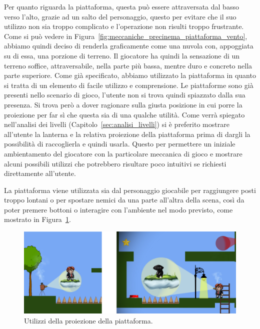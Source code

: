Per quanto riguarda la piattaforma, questa può essere attraversata dal basso verso l’alto, grazie ad un salto del personaggio, questo per evitare che il suo utilizzo non sia troppo complicato e l’operazione non risulti troppo frustrante. Come si può vedere in Figura~\ref{fig:meccaniche_precinema_piattaforma_vento}, abbiamo quindi deciso di renderla graficamente come una nuvola con, appoggiata su di essa, una porzione di terreno. Il giocatore ha quindi la sensazione di un terreno soffice, attraversabile, nella parte più bassa, mentre duro e concreto nella parte superiore.
Come già specificato, abbiamo utilizzato la piattaforma in quanto si tratta di un elemento di facile utilizzo e comprensione. Le piattaforme sono già presenti nello scenario di gioco, l’utente non si trova quindi spiazzato dalla sua presenza. Si trova però a dover ragionare sulla giusta posizione in cui porre la proiezione per far sì che questa sia di una qualche utilità.
Come verrà spiegato nell’analisi dei livelli (Capitolo~\ref{sec:analisi_livelli}) si è preferito mostrare all’utente la lanterna e la relativa proiezione della piattaforma prima di dargli la possibilità di raccoglierla e quindi usarla. Questo per permettere un iniziale ambientamento del giocatore con la particolare meccanica di gioco e mostrare alcuni possibili utilizzi che potrebbero risultare poco intuitivi se richiesti direttamente all’utente.

La piattaforma viene utilizzata sia dal personaggio giocabile per raggiungere posti troppo lontani o per spostare nemici da una parte all’altra della scena, così da poter premere bottoni o interagire con l’ambiente nel modo previsto, come mostrato in Figura~\ref{fig:meccaniche_precinema_piattaforma}.

\begin{figure}%
	\centering
	\includegraphics[width= \columnwidth]{images/gameDesign/19_piatt.jpg}
	\caption{Utilizzi della proiezione della piattaforma.}
	\label{fig:meccaniche_precinema_piattaforma}
\end{figure}

